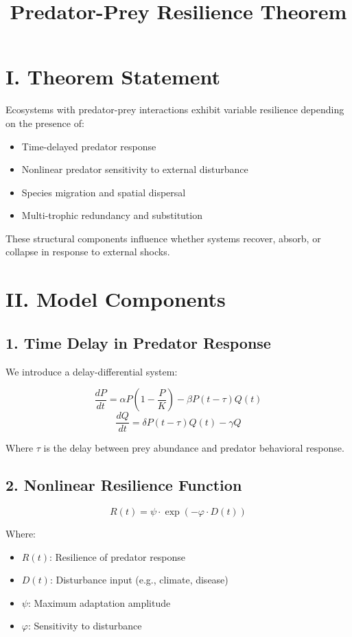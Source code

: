 \documentclass[12pt]{article}
\title{Predator-Prey Resilience Theorem}
\author{}
\date{}
\begin{document}
\maketitle

\section*{I. Theorem Statement}

Ecosystems with predator-prey interactions exhibit variable resilience depending on the presence of:

\begin{itemize}
  \item Time-delayed predator response
  \item Nonlinear predator sensitivity to external disturbance
  \item Species migration and spatial dispersal
  \item Multi-trophic redundancy and substitution
\end{itemize}

These structural components influence whether systems recover, absorb, or collapse in response to external shocks.

\section*{II. Model Components}

\subsection*{1. Time Delay in Predator Response}

We introduce a delay-differential system:

\[
\frac{dP}{dt} = \alpha P \left(1 - \frac{P}{K} \right) - \beta P(t - \tau) Q(t)
\]
\[
\frac{dQ}{dt} = \delta P(t - \tau) Q(t) - \gamma Q
\]

Where $\tau$ is the delay between prey abundance and predator behavioral response.

\subsection*{2. Nonlinear Resilience Function}

\[
R(t) = \psi \cdot \exp(-\varphi \cdot D(t))
\]

Where:
\begin{itemize}
  \item $R(t)$: Resilience of predator response
  \item $D(t)$: Disturbance input (e.g., climate, disease)
  \item $\psi$: Maximum adaptation amplitude
  \item $\varphi$: Sensitivity to disturbance
\end{itemize}
\end{document}
